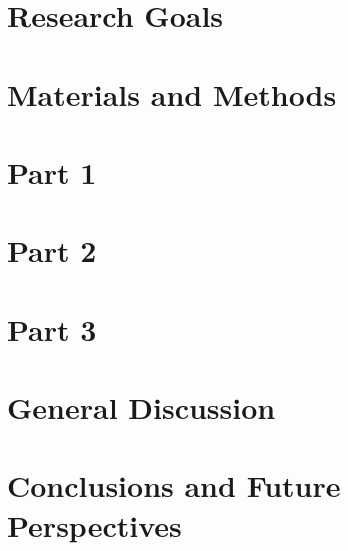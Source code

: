 \documentclass[b5paper,11pt,twoside,hidelinks]{book}
\begin{document}
\chapter{Research Goals}\label{chapter:RG}


\chapter{Materials and Methods}\label{chapter:MeM}


\chapter{Part 1}\label{chapter:P1}


\chapter{Part 2}\label{chapter:P2}


\chapter{Part 3}\label{chapter:P3}


\chapter{General Discussion}\label{chapter:DiscFin}


\chapter*{Conclusions and Future Perspectives}\label{chapter:Con}


%
\end{document}
